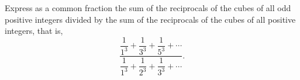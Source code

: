 Express as a common fraction the sum of the reciprocals of the cubes of all odd positive integers divided by the sum of the reciprocals of the cubes of all positive integers, that is,
\[\dfrac{\dfrac{1}{1^3}+\dfrac{1}{3^3}+\dfrac{1}{5^3}+\cdots}{\dfrac{1}{1^3}+\dfrac{1}{2^3}+\dfrac{1}{3^3}+\cdots}.\]
